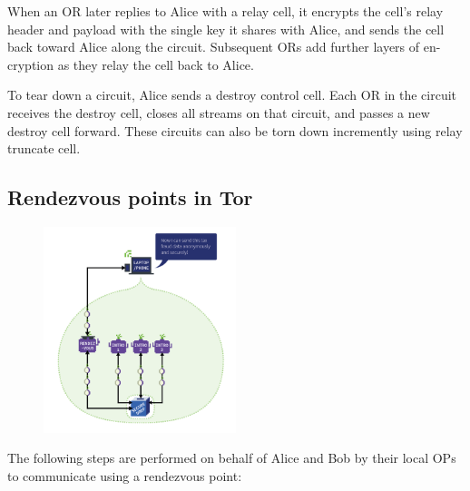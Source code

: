 \documentclass{main}
\begin{document}
When an OR later replies to Alice with a relay cell, it encrypts the cell's relay header and payload with the single key
it shares with Alice, and sends the cell back toward Alice
along the circuit. Subsequent ORs add further layers of en-
cryption as they relay the cell back to Alice.

To tear down a circuit, Alice sends a destroy control cell.
Each OR in the circuit receives the destroy cell, closes all
streams on that circuit, and passes a new destroy cell forward.
These circuits can also be torn down incremently using relay truncate cell.

\subsection{Rendezvous points in Tor}

\begin{figure}[h]
    \centering
    \includegraphics[width=0.5\textwidth]{Resources/images/onion_services.png}
\end{figure}

The following steps are performed on behalf of Alice and Bob by their local OPs to communicate using a rendezvous point:
\end{document}
